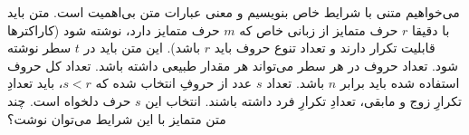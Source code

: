 \p
می‌خواهیم متنی با شرایط خاص بنویسیم و
معنی عبارات متن بی‌اهمیت است.
متن باید با دقیقا
$r$
حرف متمایز از زبانی خاص که
$m$
حرف متمایز دارد،
نوشته شود
(کاراکتر‌ها قابلیت تکرار دارند و تعداد تنوع حروف باید 
$r$
باشد).
این متن باید در 
$t$
سطر نوشته شود. تعداد حروف در هر سطر می‌تواند هر مقدار طبیعی داشته باشد.
تعداد کل حروف استفاده شده باید برابر
$n$
باشد.
تعداد
$s$
عدد از حروفِ انتخاب شده که
$s < r $،
باید تعدادِ تکرارِ زوج و مابقی، تعدادِ تکرارِ فرد داشته باشند.
انتخاب این
$s$
حرف دلخواه است.
چند متن متمایز با این شرایط می‌توان نوشت؟
